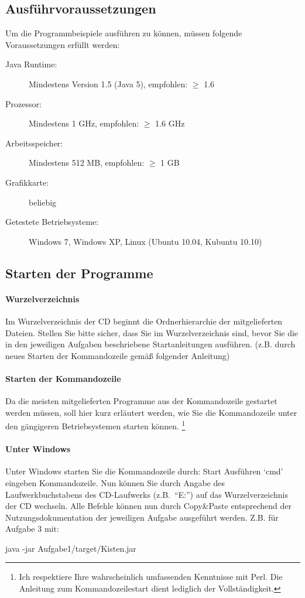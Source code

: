 \documentclass[a4paper,11pt]{scrartcl}
\theoremstyle{definition}
\theoremstyle{remark}
\begin{document}
\subsection{Ausführvoraussetzungen}
\label{Vor}
Um die Programmbeispiele ausführen zu können, müssen folgende Voraussetzungen erfüllt werden:
\begin{description}
 \item[Java Runtime:] Mindestens Version 1.5 (Java 5), empfohlen: $\geq$ 1.6 
 \item[Prozessor:] Mindestens 1 GHz, empfohlen: $\geq$ 1.6 GHz
 \item[Arbeitsspeicher:] Mindestens 512 MB, empfohlen: $\geq$ 1 GB
 \item[Grafikkarte:] beliebig
 \item[Getestete Betriebsysteme:] Windows 7, Windows XP, Linux (Ubuntu 10.04, Kubuntu 10.10)
\end{description}
\subsection{Starten der Programme}
\paragraph{Wurzelverzeichnis} Im Wurzelverzeichnis der CD beginnt die Ordnerhierarchie der mitgelieferten Dateien.
Stellen Sie bitte sicher, dass Sie im Wurzelverzeichnis sind, bevor Sie die in den jeweiligen Aufgaben beschriebene Startanleitungen ausführen.
(z.B. durch neues Starten der Kommandozeile gemäß folgender Anleitung)
\paragraph{Starten der Kommandozeile}
Da die meisten mitgelieferten Programme aus der Kommandozeile gestartet werden müssen, soll hier kurz erläutert werden,
wie Sie die Kommandozeile unter den gängigeren Betriebsystemen starten können.
\footnote{Ich respektiere Ihre wahrscheinlich umfassenden Kenntnisse mit Perl. Die Anleitung zum Kommandozeilestart dient lediglich der Vollständigkeit.}
\newcommand{\then}{\textrightarrow{} }
\paragraph{Unter Windows}
Unter Windows starten Sie die Kommandozeile durch: Start \then Ausführen \then `cmd' eingeben \then Kommandozeile.
Nun können Sie durch Angabe des Laufwerkbuchstabens des CD-Laufwerks (z.B.\ ``E:'') auf das Wurzelverzeichnis der CD wechseln.
Alle Befehle können nun durch Copy\&Paste entsprechend der Nutzungsdokumentation der jeweiligen Aufgabe ausgeführt werden. Z.B. für Aufgabe 3 mit:
\begin{center} java -jar Aufgabe1/target/Kisten.jar \end{center}
\end{document}
